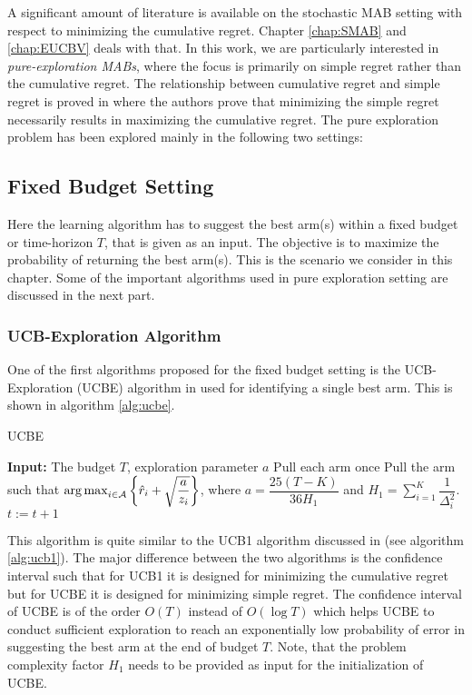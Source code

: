 A significant amount of literature is available on the stochastic MAB setting with respect to minimizing the cumulative regret. Chapter \ref{chap:SMAB} and \ref{chap:EUCBV} deals with that. In this work, we are particularly interested in \emph{pure-exploration MABs},  where the focus is primarily on simple regret rather than the cumulative regret. The relationship between cumulative regret and simple regret is proved in \citet{bubeck2011pure} where the authors prove that minimizing the simple regret necessarily results in maximizing the cumulative regret.
The pure exploration problem has been explored  mainly in the following two settings:
    
\subsection{Fixed Budget Setting} 

Here the learning algorithm has to suggest the best arm(s) within a fixed budget or time-horizon $T$, that is given as an input. The objective is to maximize the probability of returning the best arm(s).  This is the scenario we consider in this chapter. Some of the important algorithms used in pure exploration setting are discussed in the next part.

\subsubsection{UCB-Exploration Algorithm}

One of the first algorithms proposed for the fixed budget setting is the UCB-Exploration (UCBE) algorithm in \citet{audibert2010best} used for identifying a single best arm. This is shown in algorithm \ref{alg:ucbe}.


\begin{algorithm}[!ht]
\caption{UCBE}
\label{alg:ucbe}
\begin{algorithmic}[1]
\State \textbf{Input: } The budget $T$, exploration parameter $a$
\State Pull each arm once
\State Pull the arm such that $\operatorname*{arg\,max}_{i\in \mathcal{A}}\bigg\lbrace\hat{r}_{i} + \sqrt{\dfrac{a}{z_i}}\bigg\rbrace$, where $a = \dfrac{25(T-K)}{36 H_1}$ and $H_1 = \sum_{i=1}^{K}\dfrac{1}{\Delta_i^2}$.
\State $t:=t+1 $
\EndFor
\end{algorithmic}
\end{algorithm}

This algorithm is quite similar to the UCB1 algorithm discussed in \citet{auer2002finite} (see algorithm \ref{alg:ucb1}). The major difference between the two algorithms is the confidence interval such that for UCB1 it is designed for minimizing the cumulative regret but for UCBE it is designed for minimizing simple regret. The confidence interval of UCBE is of the order $O\left( T\right)$ instead of $O\left(\log T\right)$ which helps UCBE to conduct sufficient exploration to reach an exponentially low probability of error in suggesting the best arm at the end of budget $T$. Note, that the problem complexity factor $H_1$ needs to be provided as input for the initialization of UCBE.

